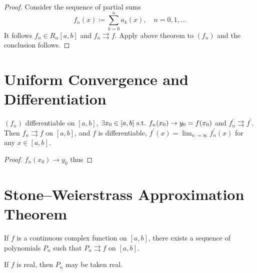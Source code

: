\begin{proof}
Consider the sequence of partial sums 
\[ f_n(x)\coloneqq\sum_{k=0}^na_k(x), \quad n=0,1,\dots \]
It follows $f_n\in R_\alpha[a,b]$ and $f_n\rightrightarrows f$. Apply above theorem to $(f_n)$ and the conclusion follows.
\end{proof}

\section{Uniform Convergence and Differentiation}
\begin{theorem}
$(f_n)$ differentiable on $[a,b]$, $\exists x_0\in[a,b]\text{ s.t. } f_n(x_0)\to y_0=f(x_0)$ and $f_n^\prime\rightrightarrows f^\prime$. Then $f_n\rightrightarrows f$ on $[a,b]$, and $f$ is differentiable, $f^\prime(x)=\lim_{n\to\infty}f_n^\prime(x)$ for any $x\in[a,b]$.
\end{theorem}

\begin{proof}
$f_n(x_0)\to y_0$ thus
\end{proof}

\section{Stone--Weierstrass Approximation Theorem}
\begin{theorem}
If $f$ is a continuous complex function on $[a,b]$, there exists a sequence of polynomials $P_n$ such that $P_n\rightrightarrows f$ on $[a,b]$.

If $f$ is real, then $P_n$ may be taken real.
\end{theorem}